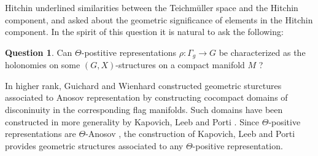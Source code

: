 \documentclass[reqno,10pt]{amsart}
\theoremstyle{plain}
\newtheorem{thm}{Theorem}[section]
\theoremstyle{definition}
\newtheorem{que}[thm]{Question}
\theoremstyle{remark}
\newcommand{\R}{\mathbb{R}}
\DeclareMathOperator{\PSL}{PSL}
\DeclareMathOperator{\SO}{SO}
\newcommand{\ie}{namely }
\begin{document}
\medskip

Hitchin underlined similarities between the Teichmüller space and the Hitchin component, and asked about the geometric significance of elements in the Hitchin component. In the spirit of this question it is natural to ask the following:

\begin{que}
Can $\Theta$-postitive representations $\rho:\Gamma_g\to G$ be characterized as the holonomies on some $(G,X)$-structures on a compact manifold $M$ ?
\end{que}


%

In higher rank, Guichard and Wienhard \cite{GWDod} constructed geometric sturctures associated to Anosov representation by constructing cocompact domains of disconinuity in the corresponding flag manifolds. 
%
%
%
%
%
Such domains have been constructed in more generality by Kapovich, Leeb and Porti \cite{KLP-DoD}. Since $\Theta$-positive representations are $\Theta$-Anosov \cite{positivityLabourie}, the construction of Kapovich, Leeb and Porti provides geometric structures associated to any $\Theta$-positive representation.
 
\end{document}
